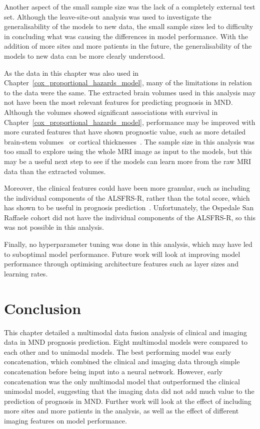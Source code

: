 Another aspect of the small sample size was the lack of a completely external test set.
Although the leave-site-out analysis was used to investigate the generalisability of the models to new data, the small sample sizes led to difficulty in concluding what was causing the differences in model performance.
With the addition of more sites and more patients in the future, the generalisability of the models to new data can be more clearly understood.

As the data in this chapter was also used in Chapter~\ref{cox_proportional_hazards_model}, many of the limitations in relation to the data were the same.
The extracted brain volumes used in this analysis may not have been the most relevant features for predicting prognosis in MND.
Although the volumes showed significant associations with survival in Chapter~\ref{cox_proportional_hazards_model}, performance may be improved with more curated features that have shown prognostic value, such as more detailed brain-stem volumes~\cite{milellaMedullaOblongataVolume2022} or cortical thicknesses~\cite{burghMultimodalLongitudinalStudy2020,dieckmannCorticalSubcorticalGrey2022}.
The sample size in this analysis was too small to explore using the whole MRI image as input to the models, but this may be a useful next step to see if the models can learn more from the raw MRI data than the extracted volumes.

Moreover, the clinical features could have been more granular, such as including the individual components of the ALSFRS-R, rather than the total score, which has shown to be useful in prognosis prediction~\cite{hothornRandomForest4LifeRandomForest2014}.
Unfortunately, the Ospedale San Raffaele cohort did not have the individual components of the ALSFRS-R, so this was not possible in this analysis.

Finally, no hyperparameter tuning was done in this analysis, which may have led to suboptimal model performance.
Future work will look at improving model performance through optimising architecture features such as layer sizes and learning rates.

\section{Conclusion}

This chapter detailed a multimodal data fusion analysis of clinical and imaging data in MND prognosis prediction.
Eight multimodal models were compared to each other and to unimodal models.
The best performing model was early concatenation, which combined the clinical and imaging data through simple concatenation before being input into a neural network.
However, early concatenation was the only multimodal model that outperformed the clinical unimodal model, suggesting that the imaging data did not add much value to the prediction of prognosis in MND.
Further work will look at the effect of including more sites and more patients in the analysis, as well as the effect of different imaging features on model performance.
